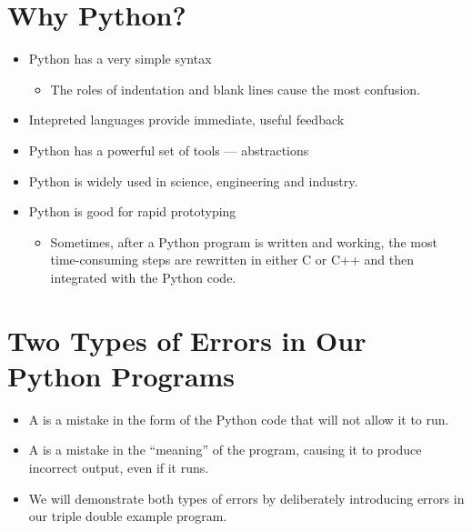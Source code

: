 \documentclass[letterpaper,10pt,english]{sphinxmanual}
\begin{document}
\section{Why Python?}
\label{\detokenize{lecture_notes/lec01_intro:why-python}}\begin{itemize}
\item {} 
Python has a very simple syntax
\begin{itemize}
\item {} 
The roles of indentation and blank lines cause the most confusion.

\end{itemize}

\item {} 
Intepreted languages provide immediate, useful feedback

\item {} 
Python has a powerful set of tools — abstractions

\item {} 
Python is widely used in science, engineering and industry.

\item {} 
Python is good for rapid prototyping
\begin{itemize}
\item {} 
Sometimes, after a Python program is written and working, the
most time-consuming steps are rewritten in either C or C++ and
then integrated with the Python code.

\end{itemize}

\end{itemize}


\section{Two Types of Errors in Our Python Programs}
\label{\detokenize{lecture_notes/lec01_intro:two-types-of-errors-in-our-python-programs}}\begin{itemize}
\item {} 
A  is a mistake in the form of the Python code that
will not allow it to run.

\item {} 
A  is a mistake in the “meaning” of the program,
causing it to produce incorrect output, even if it runs.

\item {} 
We will demonstrate both types of errors by deliberately introducing
errors in our triple double example program.

\end{itemize}
\end{document}
